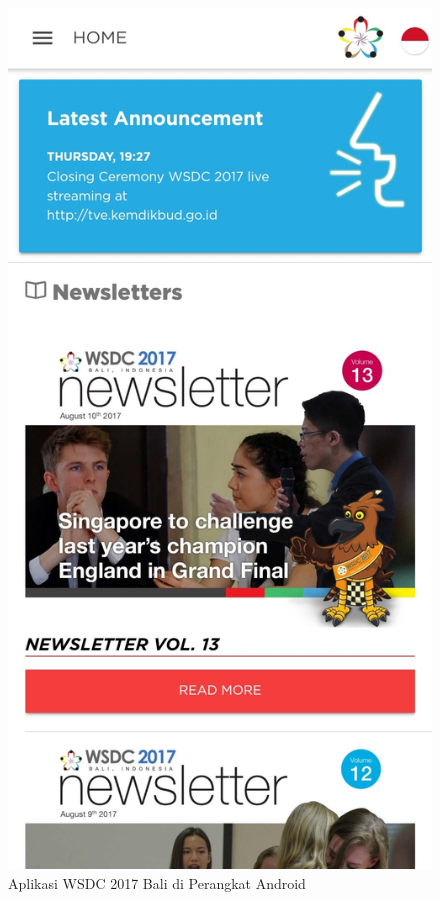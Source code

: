 \begin{figure}[H]
    \centering
    \includegraphics[scale=0.12]{Gambar/WSDC2017-App.jpg}
    \caption{Aplikasi WSDC 2017 Bali di Perangkat Android}
    \label{fig:wsdcapp}
\end{figure}

